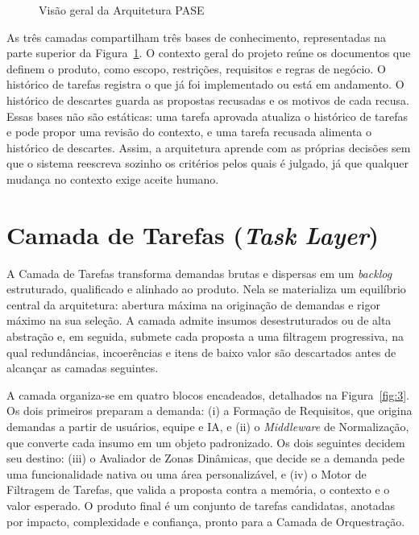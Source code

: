 \begin{figure}[htb]
\centering
\caption{Visão geral da Arquitetura PASE}
\label{fig:2}
\end{figure}

As três camadas compartilham três bases de conhecimento, representadas na parte superior da Figura~\ref{fig:2}. O contexto geral do projeto reúne os documentos que definem o produto, como escopo, restrições, requisitos e regras de negócio. O histórico de tarefas registra o que já foi implementado ou está em andamento. O histórico de descartes guarda as propostas recusadas e os motivos de cada recusa. Essas bases não são estáticas: uma tarefa aprovada atualiza o histórico de tarefas e pode propor uma revisão do contexto, e uma tarefa recusada alimenta o histórico de descartes. Assim, a arquitetura aprende com as próprias decisões sem que o sistema reescreva sozinho os critérios pelos quais é julgado, já que qualquer mudança no contexto exige aceite humano.

\section[Camada de Tarefas (Task Layer)]{Camada de Tarefas (\textit{Task Layer})}\label{sec:4.3}

A Camada de Tarefas transforma demandas brutas e dispersas em um \textit{backlog} estruturado, qualificado e alinhado ao produto. Nela se materializa um equilíbrio central da arquitetura: abertura máxima na originação de demandas e rigor máximo na sua seleção. A camada admite insumos desestruturados ou de alta abstração e, em seguida, submete cada proposta a uma filtragem progressiva, na qual redundâncias, incoerências e itens de baixo valor são descartados antes de alcançar as camadas seguintes.

A camada organiza-se em quatro blocos encadeados, detalhados na Figura~\ref{fig:3}. Os dois primeiros preparam a demanda: (i) a Formação de Requisitos, que origina demandas a partir de usuários, equipe e IA, e (ii) o \textit{Middleware} de Normalização, que converte cada insumo em um objeto padronizado. Os dois seguintes decidem seu destino: (iii) o Avaliador de Zonas Dinâmicas, que decide se a demanda pede uma funcionalidade nativa ou uma área personalizável, e (iv) o Motor de Filtragem de Tarefas, que valida a proposta contra a memória, o contexto e o valor esperado. O produto final é um conjunto de tarefas candidatas, anotadas por impacto, complexidade e confiança, pronto para a Camada de Orquestração.

